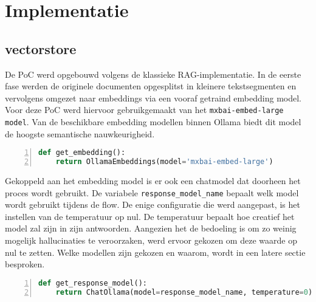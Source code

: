 
\section{Implementatie}


\subsection{vectorstore}
De PoC werd opgebouwd volgens de klassieke RAG-implementatie. In de eerste fase werden de originele documenten opgesplitst in kleinere tekstsegmenten en vervolgens omgezet naar embeddings via een vooraf getraind embedding model. Voor deze PoC werd hiervoor gebruikgemaakt van het \verb|mxbai-embed-large model|. Van de beschikbare embedding modellen binnen Ollama biedt dit model de hoogste semantische nauwkeurigheid.

\begin{lstlisting}[basicstyle=\small, frame=single, breaklines=true, postbreak=\mbox{\textcolor{red}{$\hookrightarrow$}\space}, escapeinside ={\%,}, escapechar={!}, numbers=left, language=Python, caption=Ophalen van embedding model]
def get_embedding():
    return OllamaEmbeddings(model='mxbai-embed-large')
\end{lstlisting}

Gekoppeld aan het embedding model is er ook een chatmodel dat doorheen het proces wordt gebruikt. De variabele \verb|response_model_name| bepaalt welk model wordt gebruikt tijdens de flow. De enige configuratie die werd aangepast, is het instellen van de temperatuur op nul. De temperatuur bepaalt hoe creatief het model zal zijn in zijn antwoorden. Aangezien het de bedoeling is om zo weinig mogelijk hallucinaties te veroorzaken, werd ervoor gekozen om deze waarde op nul te zetten. Welke modellen zijn gekozen en waarom, wordt in een latere sectie besproken.

\begin{lstlisting}[basicstyle=\small, frame=single, breaklines=true, postbreak=\mbox{\textcolor{red}{$\hookrightarrow$}\space}, escapeinside ={\%,}, escapechar={!},
numbers=left, language=Python, caption=Initialisatie van het chat model]
def get_response_model():
    return ChatOllama(model=response_model_name, temperature=0)
\end{lstlisting}

